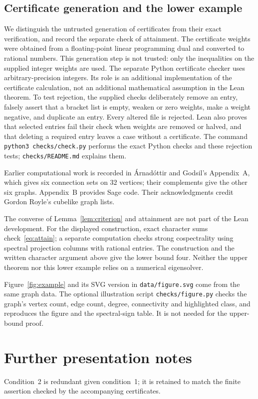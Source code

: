 \subsection{Certificate generation and the lower example}
We distinguish the untrusted generation of certificates from their
exact verification, and record the separate check of attainment.
The certificate weights were obtained from a floating-point linear
programming dual and converted to rational numbers.
This generation step is not trusted: only the inequalities on the
supplied integer weights are used. The separate Python certificate
checker uses arbitrary-precision integers. Its role is an additional
implementation of the certificate calculation, not an additional
mathematical assumption in the Lean theorem.
To test rejection, the supplied checks deliberately remove an entry,
falsely assert that a bracket list is empty, weaken or zero weights,
make a weight negative, and duplicate an entry. Every altered file is
rejected. Lean also proves that selected entries fail their check when
weights are removed or halved, and that deleting a required entry
leaves a case without a certificate. The command
\texttt{python3 checks/check.py} performs the exact Python checks
and these rejection tests; \texttt{checks/README.md} explains them.

Earlier computational work is recorded in \'Arnad\'ottir and Godsil's
Appendix~A, which gives six connection sets on $32$ vertices; their
complements give the other six graphs. Appendix~B provides Sage code.
Their acknowledgments credit Gordon Royle's cubelike graph lists.

The converse of Lemma~\ref{lem:criterion} and attainment are not part
of the Lean development. For the displayed construction, exact
character sums check~\eqref{eq:attain}; a separate computation checks
strong cospectrality using spectral projection columns with rational
entries. The construction and the written character argument above
give the lower bound four. Neither the upper theorem nor this lower
example relies on a numerical eigensolver.

Figure~\ref{fig:example} and its SVG version in \texttt{data/figure.svg}
come from the same graph data. The optional illustration script
\texttt{checks/figure.py} checks the graph's vertex count, edge count,
degree, connectivity and highlighted class, and reproduces the figure
and the spectral-sign table. It is not needed for the upper-bound proof.


\section{Further presentation notes}
Condition~2 is
redundant given condition~1; it is retained to match the finite assertion
checked by the accompanying certificates.

